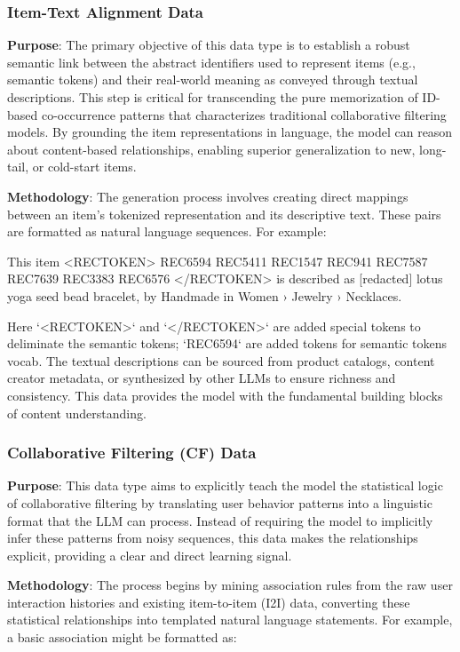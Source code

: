 \documentclass[]{fairmeta}
\begin{document}
\subsubsection{Item-Text Alignment Data}
\textbf{Purpose}: The primary objective of this data type is to establish a robust semantic link between the abstract identifiers used to represent items (e.g., semantic tokens) and their real-world meaning as conveyed through textual descriptions. This step is critical for transcending the pure memorization of ID-based co-occurrence patterns that characterizes traditional collaborative filtering models. By grounding the item representations in language, the model can reason about content-based relationships, enabling superior generalization to new, long-tail, or cold-start items.

\textbf{Methodology}: The generation process involves creating direct mappings between an item's tokenized representation and its descriptive text. These pairs are formatted as natural language sequences. For example: 
\begin{boxA}
This item <RECTOKEN> REC6594 REC5411 REC1547 REC941 REC7587 REC7639 REC3383 REC6576 
</RECTOKEN> is described as [redacted] lotus yoga seed bead bracelet, by Handmade in 
Women › Jewelry › Necklaces.
\end{boxA}
Here `<RECTOKEN>` and `</RECTOKEN>` are added special tokens to deliminate the semantic tokens; `REC6594` are added tokens for semantic tokens vocab. The textual descriptions can be sourced from product catalogs, content creator metadata, or synthesized by other LLMs to ensure richness and consistency. This data provides the model with the fundamental building blocks of content understanding.
\subsubsection{Collaborative Filtering (CF) Data}
\textbf{Purpose}: This data type aims to explicitly teach the model the statistical logic of collaborative filtering by translating user behavior patterns into a linguistic format that the LLM can process. Instead of requiring the model to implicitly infer these patterns from noisy sequences, this data makes the relationships explicit, providing a clear and direct learning signal.

\textbf{Methodology}: The process begins by mining association rules from the raw user interaction histories and existing item-to-item (I2I) data, converting these statistical relationships into templated natural language statements. For example, a basic association might be formatted as: 
\end{document}
